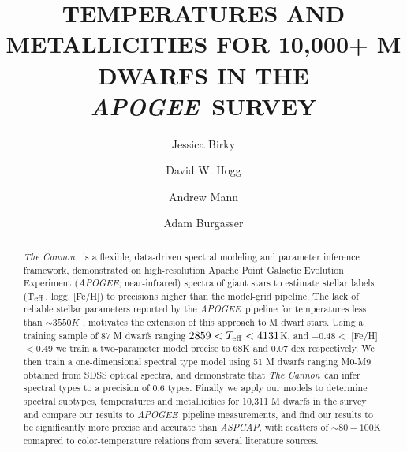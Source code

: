 \documentclass[modern]{aastex62}
\newcommand{\apogee}{\textsl{APOGEE}}
\newcommand{\thecannon}{\textsl{The Cannon}}
\newcommand{\aspcap}{\textsl{ASPCAP}}
\begin{document}
\title{TEMPERATURES AND METALLICITIES FOR 10,000+ M DWARFS IN THE \apogee\  SURVEY}


\author[0000-0002-7961-6881]{Jessica Birky}

\author[0000-0003-2866-9403]{David W. Hogg}

\author[0000-0003-3654-1602]{Andrew Mann}

\author[0000-0002-6523-9536]{Adam Burgasser}

\begin{abstract}

\thecannon\ \citep{Ness:2015} is a flexible, data-driven spectral modeling and parameter inference framework, demonstrated on high-resolution Apache Point Galactic Evolution Experiment (\apogee; near-infrared) spectra of giant stars to estimate stellar labels (T$_{\rm eff}$, logg, [Fe/H]) to precisions higher than the model-grid pipeline. The lack of reliable stellar parameters reported by the \apogee\ pipeline for temperatures less than $\sim3550K$ \citep{Schmidt:2016}, motivates the extension of this approach to M dwarf stars. Using a training sample of 87 M dwarfs ranging $2859 < T_{\rm eff} < 4131$K, and $-0.48 <$ [Fe/H] $< 0.49$ we train a two-parameter model precise to 68K and 0.07 dex respectively. We then train a one-dimensional spectral type model using 51 M dwarfs ranging M0-M9 obtained from SDSS optical spectra, and demonstrate that \thecannon\ can infer spectral types to a precision of 0.6 types. Finally we apply our models to determine spectral subtypes, temperatures and metallicities for 10,311 M dwarfs in the survey and compare our results to \apogee\ pipeline measurements, and find our results to be significantly more precise and accurate than \aspcap, with scatters of $\sim80-100$K comapred to color-temperature relations from several literature sources.

\end{abstract}
\end{document}
